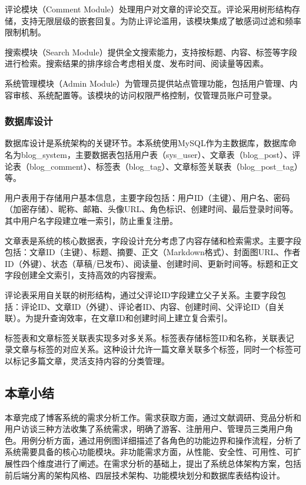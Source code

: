 \documentclass[UTF8,AutoFakeBold=1,AutoFakeSlant,zihao=-4]{SCAU}
\begin{document}
 评论模块（Comment Module）处理用户对文章的评论交互。评论采用树形结构存储，支持无限层级的嵌套回复。为防止评论滥用，该模块集成了敏感词过滤和频率限制机制。

 搜索模块（Search Module）提供全文搜索能力，支持按标题、内容、标签等字段进行检索。搜索结果的排序综合考虑相关度、发布时间、阅读量等因素。

 系统管理模块（Admin Module）为管理员提供站点管理功能，包括用户管理、内容审核、系统配置等。该模块的访问权限严格控制，仅管理员账户可登录。

 \subsubsection{数据库设计}

 数据库设计是系统架构的关键环节。本系统使用MySQL作为主数据库，数据库命名为blog\_system，主要数据表包括用户表（sys\_user）、文章表（blog\_post）、评论表（blog\_comment）、标签表（blog\_tag）、文章标签关联表（blog\_post\_tag）等。

 用户表用于存储用户基本信息，主要字段包括：用户ID（主键）、用户名、密码（加密存储）、昵称、邮箱、头像URL、角色标识、创建时间、最后登录时间等。其中用户名字段建立唯一索引，防止重复注册。

 文章表是系统的核心数据表，字段设计充分考虑了内容存储和检索需求。主要字段包括：文章ID（主键）、标题、摘要、正文（Markdown格式）、封面图URL、作者ID（外键）、状态（草稿/已发布）、阅读量、创建时间、更新时间等。标题和正文字段创建全文索引，支持高效的内容搜索。

 评论表采用自关联的树形结构，通过父评论ID字段建立父子关系。主要字段包括：评论ID、文章ID（外键）、评论者ID、内容、创建时间、父评论ID（自关联）。为提升查询效率，在文章ID和创建时间上建立复合索引。

 标签表和文章标签关联表实现多对多关系。标签表存储标签ID和名称，关联表记录文章与标签的对应关系。这种设计允许一篇文章关联多个标签，同时一个标签可以标记多篇文章，灵活支持内容的分类管理。

 \subsection{本章小结}

 本章完成了博客系统的需求分析工作。需求获取方面，通过文献调研、竞品分析和用户访谈三种方法收集了系统需求，明确了游客、注册用户、管理员三类用户角色。用例分析方面，通过用例图详细描述了各角色的功能边界和操作流程，分析了系统需要具备的核心功能模块。非功能需求方面，从性能、安全性、可用性、可扩展性四个维度进行了阐述。在需求分析的基础上，提出了系统总体架构方案，包括前后端分离的架构风格、四层技术架构、功能模块划分和数据库表结构设计。
\end{document}
